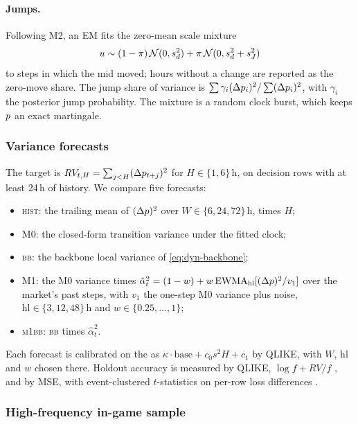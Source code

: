 \paragraph{Jumps.}
Following M2, an EM \citep{dempster1977} fits the zero-mean scale mixture
\begin{equation}\label{eq:dyn-em}
u\sim(1-\pi)\,\mathcal{N}(0,s_d^2)+\pi\,\mathcal{N}(0,s_d^2+s_J^2)
\end{equation}
to steps in which the mid moved; hours without a change are reported as the zero-move share. The
jump share of variance is $\sum\gamma_i(\Delta p_i)^2/\sum(\Delta p_i)^2$, with $\gamma_i$ the
posterior jump probability. The mixture is a random clock burst, which keeps $p$ an exact
martingale.

\subsubsection{Variance forecasts}\label{sec:dyn-forecast}

The target is $RV_{t,H}=\sum_{j<H}(\Delta p_{t+j})^2$ for $H\in\{1,6\}$\,h, on decision rows with at
least 24\,h of history. We compare five forecasts:
\begin{itemize}
\item \textsc{hist}: the trailing mean of $(\Delta p)^2$ over $W\in\{6,24,72\}$\,h, times $H$;
\item M0: the closed-form transition variance under the fitted clock;
\item \textsc{bb}: the backbone local variance of \cref{eq:dyn-backbone};
\item M1: the M0 variance times
  $\hat\alpha_t^2=(1-w)+w\,\mathrm{EWMA}_{\mathrm{hl}}[(\Delta p)^2/v_1]$ over the market's past
  steps, with $v_1$ the one-step M0 variance plus noise, $\mathrm{hl}\in\{3,12,48\}$\,h and
  $w\in\{0.25,\ldots,1\}$;
\item \textsc{m1bb}: \textsc{bb} times $\hat\alpha_t^2$.
\end{itemize}
Each forecast is calibrated on the \estim{} as $\kappa\cdot\text{base}+c_0s^2H+c_1$ by QLIKE, with
$W$, hl and $w$ chosen there. Holdout accuracy is measured by QLIKE, $\log f+RV/f$
\citep{patton2011}, and by MSE, with event-clustered $t$-statistics on per-row loss differences
\citep{dieboldmariano1995}.

\subsubsection{High-frequency in-game sample}\label{sec:dyn-hf}

